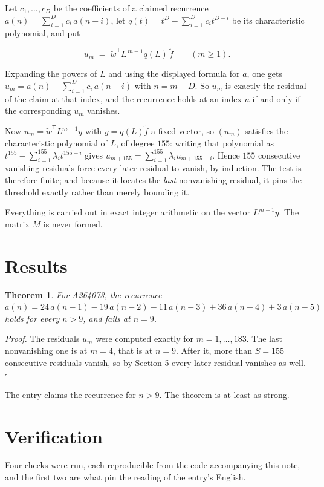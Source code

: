 \documentclass[11pt]{article}
\newtheorem{theorem}{Theorem}
\theoremstyle{definition}
\begin{document}
Let $c_1,\dots,c_D$ be the coefficients of a claimed recurrence $a(n) = \sum_{i=1}^{D} c_i\,a(n-i)$, let $q(t) = t^{D} - \sum_{i=1}^{D} c_i t^{D-i}$ be its characteristic polynomial, and put

\[u_m \;=\; \tilde w^{\mathsf T} L^{\,m-1} q(L)\,\tilde f \qquad (m \ge 1).\]

Expanding the powers of $L$ and using the displayed formula for $a$, one gets $u_m = a(n) - \sum_{i=1}^{D} c_i\,a(n-i)$ with $n = m + D$. So $u_m$ is exactly the residual of the claim at that index, and the recurrence holds at an index $n$ if and only if the corresponding $u_m$ vanishes.

Now $u_m = \tilde w^{\mathsf T} L^{m-1} y$ with $y = q(L)\tilde f$ a fixed vector, so $(u_m)$ satisfies the characteristic polynomial of $L$, of degree $155$: writing that polynomial as $t^{155} - \sum_{i=1}^{155} \lambda_i t^{155-i}$ gives $u_{m+155} = \sum_{i=1}^{155} \lambda_i u_{m+155-i}$. Hence $155$ consecutive vanishing residuals force every later residual to vanish, by induction. The test is therefore finite; and because it locates the {\itshape last} nonvanishing residual, it pins the threshold exactly rather than merely bounding it.

Everything is carried out in exact integer arithmetic on the vector $L^{m-1}y$. The matrix $M$ is never formed.

\section{Results}

\begin{theorem} For A264073, the recurrence $a(n) = 24\,a(n-1) - 19\,a(n-2) - 11\,a(n-3) + 36\,a(n-4) + 3\,a(n-5)$ holds for every $n > 9$, and fails at $n = 9$.\end{theorem}

{\itshape Proof.} The residuals $u_m$ were computed exactly for $m = 1,\dots,183$. The last nonvanishing one is at $m = 4$, that is at $n = 9$. After it, more than $S = 155$ consecutive residuals vanish, so by Section 5 every later residual vanishes as well. $\square$

The entry claims the recurrence for $n > 9$. The theorem is at least as strong.

\section{Verification}

Four checks were run, each reproducible from the code accompanying this note, and the first two are what pin the reading of the entry's English.
\end{document}
